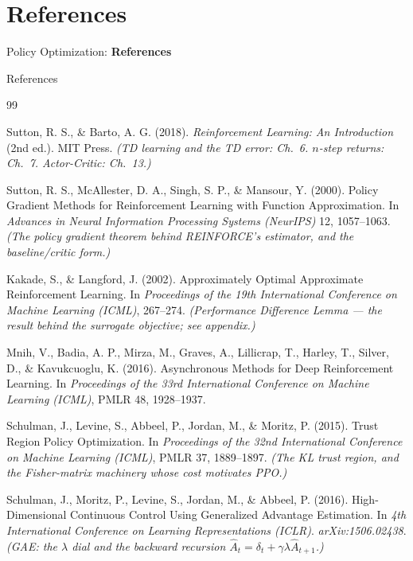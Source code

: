 \section{References}
\begin{frame}{}
    \LARGE Policy Optimization: \textbf{References}
\end{frame}

\begin{frame}[allowframebreaks]{References}
\begin{thebibliography}{99}

Sutton, R. S., \& Barto, A. G. (2018).
\newblock \emph{Reinforcement Learning: An Introduction} (2nd ed.). MIT Press.
\newblock \textit{(TD learning and the TD error: Ch.\ 6. $n$-step returns: Ch.\ 7. Actor-Critic: Ch.\ 13.)}

Sutton, R. S., McAllester, D. A., Singh, S. P., \& Mansour, Y. (2000).
\newblock Policy Gradient Methods for Reinforcement Learning with Function Approximation.
\newblock In \emph{Advances in Neural Information Processing Systems (NeurIPS)} 12, 1057--1063.
\newblock \textit{(The policy gradient theorem behind REINFORCE's estimator, and the baseline/critic form.)}

Kakade, S., \& Langford, J. (2002).
\newblock Approximately Optimal Approximate Reinforcement Learning.
\newblock In \emph{Proceedings of the 19th International Conference on Machine Learning (ICML)}, 267--274.
\newblock \textit{(Performance Difference Lemma --- the result behind the surrogate objective; see appendix.)}

Mnih, V., Badia, A. P., Mirza, M., Graves, A., Lillicrap, T., Harley, T., Silver, D., \& Kavukcuoglu, K. (2016).
\newblock Asynchronous Methods for Deep Reinforcement Learning.
\newblock In \emph{Proceedings of the 33rd International Conference on Machine Learning (ICML)}, PMLR 48, 1928--1937.

Schulman, J., Levine, S., Abbeel, P., Jordan, M., \& Moritz, P. (2015).
\newblock Trust Region Policy Optimization.
\newblock In \emph{Proceedings of the 32nd International Conference on Machine Learning (ICML)}, PMLR 37, 1889--1897.
\newblock \textit{(The KL trust region, and the Fisher-matrix machinery whose cost motivates PPO.)}

Schulman, J., Moritz, P., Levine, S., Jordan, M., \& Abbeel, P. (2016).
\newblock High-Dimensional Continuous Control Using Generalized Advantage Estimation.
\newblock In \emph{4th International Conference on Learning Representations (ICLR)}. \emph{arXiv:1506.02438}.
\newblock \textit{(GAE: the $\lambda$ dial and the backward recursion $\hat{A}_t = \delta_t + \gamma\lambda\hat{A}_{t+1}$.)}


\end{thebibliography}
\end{frame}

